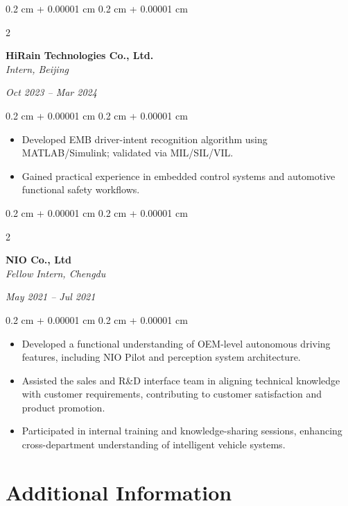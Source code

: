 \documentclass[10pt, letterpaper]{article}
\newenvironment{highlights}{
    \begin{itemize}[
        topsep=0.10 cm,
        parsep=0.10 cm,
        partopsep=0pt,
        itemsep=0pt,
        leftmargin=0.4 cm + 10pt
    ]
}{
    \end{itemize}
}
\newenvironment{onecolentry}{
    \begin{adjustwidth}{
        0.2 cm + 0.00001 cm
    }{
        0.2 cm + 0.00001 cm
    }
}{
    \end{adjustwidth}
}
\newenvironment{twocolentry}[2][]{
    \onecolentry
    \def\secondColumn{#2}
    \setcolumnwidth{\fill, 4.5 cm}
    \begin{paracol}{2}
}{
    \switchcolumn \raggedleft \secondColumn
    \end{paracol}
    \endonecolentry
}
\begin{document}
    \vspace{0.3cm}

    \begin{twocolentry}{\textit{Oct 2023 -- Mar 2024}}
        \textbf{HiRain Technologies Co., Ltd.} \\
        \textit{Intern, Beijing}
    \end{twocolentry}

    \vspace{0.10 cm}
    \begin{onecolentry}
        \begin{highlights}
            \item Developed EMB driver-intent recognition algorithm using MATLAB/Simulink; validated via MIL/SIL/VIL.
            \item Gained practical experience in embedded control systems and automotive functional safety workflows.
        \end{highlights}
    \end{onecolentry}

    \vspace{0.2 cm}

    \begin{twocolentry}{\textit{May 2021 -- Jul 2021}}
        \textbf{NIO Co., Ltd} \\
        \textit{Fellow Intern, Chengdu}
    \end{twocolentry}

    \vspace{0.10 cm}
    \begin{onecolentry}
        \begin{highlights}
            \item Developed a functional understanding of OEM-level autonomous driving features, including NIO Pilot and perception system architecture.
            \item Assisted the sales and R\&D interface team in aligning technical knowledge with customer requirements, contributing to customer satisfaction and product promotion.
            \item Participated in internal training and knowledge-sharing sessions, enhancing cross-department understanding of intelligent vehicle systems.
        \end{highlights}
    \end{onecolentry}

    \vspace{0.3 cm}

    \section{Additional Information}
\end{document}
